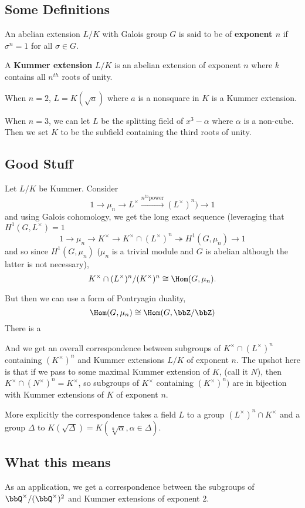 \documentclass[12pt]{article}
\begin{document}
\subsection{Some Definitions}
\begin{defn}
	An abelian extension $L/K$ with Galois group $G$ is said to be of \textbf{exponent $n$} if $\sigma^n=1$ for all $\sigma\in G$.
\end{defn}
\begin{defn}
	A \textbf{Kummer extension} $L/K$ is an abelian extension of exponent $n$ where $k$ contains all $n^{th}$ roots of unity.
\end{defn}
\begin{ex}
	When $n=2$, $L=K(\sqrt{a})$ where $a$ is a nonsquare in $K$ is a Kummer extension.

	When $n=3$, we can let $L$ be the splitting field of $x^3-\alpha$ where $\alpha$ is a non-cube. Then we set $K$ to be the subfield containing the third roots of unity.
\end{ex}

\subsection{Good Stuff}
Let $L/K$ be Kummer. Consider 
\[1\to \mu_n\to L^\times\xrightarrow{n^{th}\text{power}}(L^\times)^n)\to 1\]
and using Galois cohomology, we get the long exact sequence (leveraging that $H^1(G,L^\times)=1$
\[1\to \mu_n\to K^\times\to K^\times\cap(L^\times)^n\twoheadrightarrow H^1(G,\mu_n)\to 1\]
and so since $H^1(G,\mu_n)$ ($\mu_n$ is a trivial module and $G$ is abelian although the latter is not necessary), 
\[K^\times\cap(L^\times)^n/(K^\times)^n\cong \Hom(G,\mu_n).\]

But then we can use a form of Pontryagin duality,
\[\Hom(G,\mu_n)\cong\Hom(G,\bbZ/\bbZ)\]
There is a 

And we get an overall correspondence between subgroups of $K^\times\cap (L^\times)^n$ containing $(K^\times)^n$ and 
Kummer extensions $L/K$ of exponent $n$. The upshot here is that if we pass to some maximal Kummer extension of $K$, (call it $N$), 
then $K^\times\cap (N^\times)^n=K^\times$, so subgroups of $K^\times$ containing $(K^\times)^n)$ are in bijection with 
Kummer extensions of $K$ of exponent $n$.

More explicitly the correspondence takes a field $L$ to a group $(L^\times)^n\cap K^\times$ and a group $\Delta$ to $K(\sqrt{\Delta})=K(\sqrt[n]{\alpha},\alpha\in\Delta)$.

\subsection{What this means}
As an application, we get a correspondence between the subgroups of $\bbQ^\times/(\bbQ^\times)^2$ and Kummer extensions of exponent 2.
\end{document}
